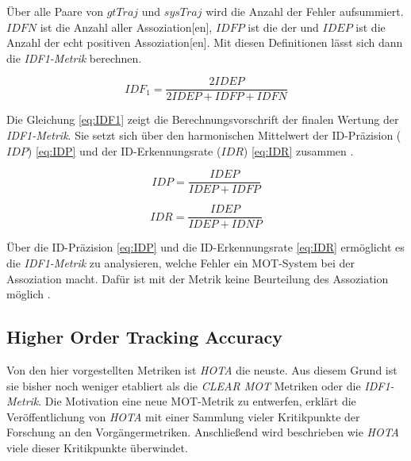 Über alle Paare von \(gtTraj\) und \(sysTraj\) wird die Anzahl der Fehler aufsummiert. \(IDFN\) ist die Anzahl aller  \gls{Assoziation}[en], \(IDFP\) ist die der  und \(IDEP\) ist die Anzahl der echt positiven \gls{Assoziation}[en]. Mit diesen Definitionen lässt sich dann die \textit{\gls{IDF1}-Metrik} berechnen. 

\begin{equation}
    \label{eq:IDF1}
    IDF_1 = \frac{2 IDEP}{2 IDEP+IDFP+IDFN}
\end{equation}

Die Gleichung \ref{eq:IDF1} zeigt die Berechnungsvorschrift der finalen Wertung der \textit{\gls{IDF1}-Metrik}. Sie setzt sich über den harmonischen Mittelwert der ID-Präzision (\(IDP\)) \ref{eq:IDP} und der ID-Erkennungsrate (\(IDR\)) \ref{eq:IDR} zusammen \cite{IDF1, Kroschel.2011}.

\begin{equation}
    \label{eq:IDP}
    IDP = \frac{IDEP}{IDEP+IDFP}
\end{equation}

\begin{equation}
    \label{eq:IDR}
    IDR = \frac{IDEP}{IDEP+IDNP}
\end{equation}

Über die ID-Präzision \ref{eq:IDP} und die ID-Erkennungsrate \ref{eq:IDR} ermöglicht es die \textit{\gls{IDF1}-Metrik} zu analysieren, welche Fehler ein \gls{MOT}-System bei der \gls{Assoziation} macht. Dafür ist mit der Metrik keine Beurteilung des \gls{Assoziation} möglich \cite{IDF1, HOTA}. 

\subsection{Higher Order Tracking Accuracy}
Von den hier vorgestellten Metriken ist \textit{\gls{HOTA}} die neuste. Aus diesem Grund ist sie bisher noch weniger etabliert als die \textit{\acrshort{CLEAR} \gls{MOT}} Metriken oder die \textit{\gls{IDF1}-Metrik}. Die Motivation eine neue \gls{MOT}-Metrik zu entwerfen, erklärt die Veröffentlichung von \textit{\gls{HOTA}} \cite{HOTA} mit einer Sammlung vieler Kritikpunkte der Forschung an den Vorgängermetriken. Anschließend wird beschrieben wie \textit{\gls{HOTA}} viele dieser Kritikpunkte überwindet. \par

